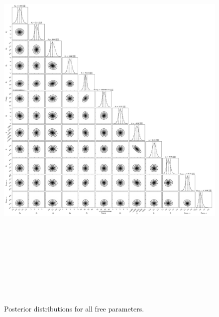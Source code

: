 \documentclass{emulateapj}
\begin{document}
 
\begin{figure}[!h]
\centering

\includegraphics[height=8.0in,width=6.0in,keepaspectratio]{rdvel+harps_corner.pdf}
\caption{Posterior distributions for all free parameters.}
\end{figure} 

 
\end{document}

